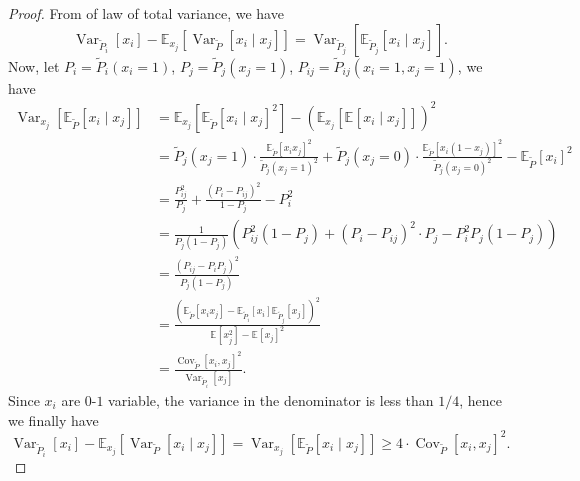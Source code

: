 \begin{proof}
	From of law of total variance, we have
	\[
		\mathop{\mathrm{Var}}\nolimits_{\widetilde{P} _i}\left[x_i \right]  - \mathbb{E}_{x_j}\left[\mathop{\mathrm{Var}}\nolimits_{\widetilde{P} }\left[x_i \mid x_j \right]  \right] = \mathop{\mathrm{Var}}\nolimits_{\widetilde{P} _{j}}\left[\mathbb{E}_{\widetilde{P} _j}\left[x_i \mid x_j \right]  \right] .
	\]
	Now, let \(P_i = \widetilde{P} _i(x_i = 1)\), \(P_j= \widetilde{P} _j(x_j = 1)\), \(P_{ij}= \widetilde{P} _{ij}(x_i=1, x_j=1) \), we have
	\[
		\begin{split}
			\mathop{\mathrm{Var}}\nolimits_{x_j}\left[\mathbb{E}_{\widetilde{P} }\left[x_i \mid x_j \right] \right]
			&= \mathbb{E}_{x_j}\left[\mathbb{E}_{\widetilde{P} }\left[x_i \mid x_j \right] ^{2} \right] - \left( \mathbb{E}_{x_j}\left[ \mathbb{E}_{}\left[x_i\mid x_j \right] \right]  \right)^{2} \\
			&=\widetilde{P} _j(x_j = 1)\cdot \frac{\mathbb{E}_{\widetilde{P} }\left[x_i x_j \right]^{2}}{\widetilde{P} _j(x_j = 1)^{2}} + \widetilde{P} _j(x_j = 0)\cdot \frac{\mathbb{E}_{\widetilde{P} }\left[x_i (1-x_j) \right]^{2}}{\widetilde{P} _j(x_j = 0)^{2}} - \mathbb{E}_{\widetilde{P} }\left[ x_i\right] ^{2} \\
			&=\frac{P_{ij} ^{2} }{P_j} + \frac{(P_i - P_{ij} )^{2} }{1-P_j}- P_i ^{2} \\
			&=\frac{1}{P_j(1-P_j)} \left( P_{ij}^{2} (1-P_j) + (P_i - P_{ij} )^{2} \cdot P_j - P_i ^{2} P_j(1-P_j)  \right)\\
			&= \frac{(P_{ij} - P_i P_j)^{2} }{P_j(1-P_j)}\\
			&= \frac{\left( \mathbb{E}_{\widetilde{P} }\left[ x_i x_j\right] - \mathbb{E}_{\widetilde{P} _i}\left[ x_i\right] \mathbb{E}_{\widetilde{P} _j}\left[x_j \right] \right) ^{2} }{\mathbb{E}_{}\left[x_j^2 \right] - \mathbb{E}_{}\left[x_j \right] ^{2} }\\
			&= \frac{\mathop{\mathrm{Cov}}\nolimits_{\widetilde{P} }\left[x_i, x_j \right]^{2}  }{\mathop{\mathrm{Var}}\nolimits_{\widetilde{P} _i}\left[x_j \right] }.
		\end{split}
	\]
	Since \(x_i\) are \(0\)-\(1\) variable, the variance in the denominator is less than \(1 / 4\), hence we finally have
	\[
		\mathop{\mathrm{Var}}\nolimits_{\widetilde{P} _i}\left[x_i \right]  - \mathbb{E}_{x_j}\left[\mathop{\mathrm{Var}}\nolimits_{\widetilde{P} }\left[x_i \mid x_j \right]  \right] = \mathop{\mathrm{Var}}\nolimits_{x_j}\left[ \mathbb{E}_{\widetilde{P} }\left[x_i \mid x_j \right] \right] \geq 4\cdot \mathop{\mathrm{Cov}}\nolimits_{\widetilde{P} }\left[x_i, x_j \right]^{2} .
	\]
\end{proof}

